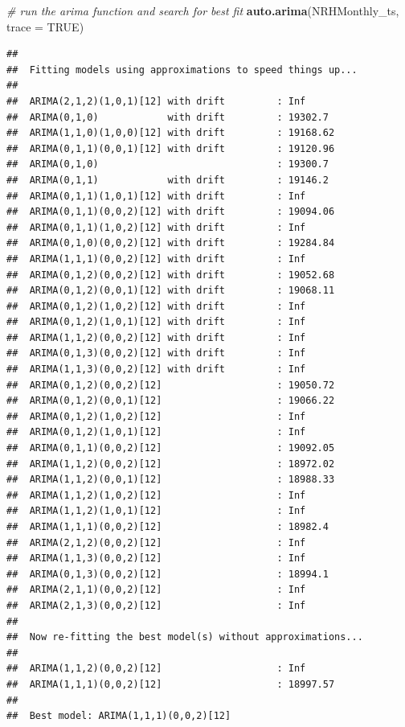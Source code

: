 \documentclass[12pt,]{article}
\newenvironment{Shaded}{\begin{snugshade}}{\end{snugshade}}
\newcommand{\CommentTok}[1]{\textcolor[rgb]{0.56,0.35,0.01}{\textit{#1}}}
\newcommand{\DataTypeTok}[1]{\textcolor[rgb]{0.13,0.29,0.53}{#1}}
\newcommand{\KeywordTok}[1]{\textcolor[rgb]{0.13,0.29,0.53}{\textbf{#1}}}
\newcommand{\NormalTok}[1]{#1}
\newcommand{\OtherTok}[1]{\textcolor[rgb]{0.56,0.35,0.01}{#1}}
\begin{document}
\begin{Shaded}
\begin{Highlighting}[]
\CommentTok{# run the arima function and search for best fit}
\KeywordTok{auto.arima}\NormalTok{(NRHMonthly_ts, }\DataTypeTok{trace =} \OtherTok{TRUE}\NormalTok{)}
\end{Highlighting}
\end{Shaded}

\begin{verbatim}
## 
##  Fitting models using approximations to speed things up...
## 
##  ARIMA(2,1,2)(1,0,1)[12] with drift         : Inf
##  ARIMA(0,1,0)            with drift         : 19302.7
##  ARIMA(1,1,0)(1,0,0)[12] with drift         : 19168.62
##  ARIMA(0,1,1)(0,0,1)[12] with drift         : 19120.96
##  ARIMA(0,1,0)                               : 19300.7
##  ARIMA(0,1,1)            with drift         : 19146.2
##  ARIMA(0,1,1)(1,0,1)[12] with drift         : Inf
##  ARIMA(0,1,1)(0,0,2)[12] with drift         : 19094.06
##  ARIMA(0,1,1)(1,0,2)[12] with drift         : Inf
##  ARIMA(0,1,0)(0,0,2)[12] with drift         : 19284.84
##  ARIMA(1,1,1)(0,0,2)[12] with drift         : Inf
##  ARIMA(0,1,2)(0,0,2)[12] with drift         : 19052.68
##  ARIMA(0,1,2)(0,0,1)[12] with drift         : 19068.11
##  ARIMA(0,1,2)(1,0,2)[12] with drift         : Inf
##  ARIMA(0,1,2)(1,0,1)[12] with drift         : Inf
##  ARIMA(1,1,2)(0,0,2)[12] with drift         : Inf
##  ARIMA(0,1,3)(0,0,2)[12] with drift         : Inf
##  ARIMA(1,1,3)(0,0,2)[12] with drift         : Inf
##  ARIMA(0,1,2)(0,0,2)[12]                    : 19050.72
##  ARIMA(0,1,2)(0,0,1)[12]                    : 19066.22
##  ARIMA(0,1,2)(1,0,2)[12]                    : Inf
##  ARIMA(0,1,2)(1,0,1)[12]                    : Inf
##  ARIMA(0,1,1)(0,0,2)[12]                    : 19092.05
##  ARIMA(1,1,2)(0,0,2)[12]                    : 18972.02
##  ARIMA(1,1,2)(0,0,1)[12]                    : 18988.33
##  ARIMA(1,1,2)(1,0,2)[12]                    : Inf
##  ARIMA(1,1,2)(1,0,1)[12]                    : Inf
##  ARIMA(1,1,1)(0,0,2)[12]                    : 18982.4
##  ARIMA(2,1,2)(0,0,2)[12]                    : Inf
##  ARIMA(1,1,3)(0,0,2)[12]                    : Inf
##  ARIMA(0,1,3)(0,0,2)[12]                    : 18994.1
##  ARIMA(2,1,1)(0,0,2)[12]                    : Inf
##  ARIMA(2,1,3)(0,0,2)[12]                    : Inf
## 
##  Now re-fitting the best model(s) without approximations...
## 
##  ARIMA(1,1,2)(0,0,2)[12]                    : Inf
##  ARIMA(1,1,1)(0,0,2)[12]                    : 18997.57
## 
##  Best model: ARIMA(1,1,1)(0,0,2)[12]
\end{verbatim}
\end{document}
